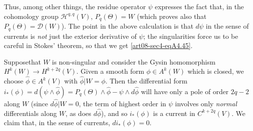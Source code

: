 Thus, among other things, the residue operator $\psi$ expresses the fact that, in the cohomology group $\mathscr{H}^{q,q}(V)$, $P_{q}(\Theta)=W$ (which proves also that $P_{q}(\Theta)=\mathscr{D}(W)$). The point in the above calculation is that $d\psi$ in the sense of currents is {\em not} just the exterior derivative of $\psi$; the singularities force us to be careful in Stokes' theorem, so that we get \eqref{art08-sec4-eqA4.45}.

Suppose\pageoriginale that $W$ is non-singular and consider the Gysin homomorphism $H^{k}(W)\to H^{k+2q}(V)$. Given a smooth form $\phi\in A^{k}(W)$ which is closed, we choose $\widehat{\phi}\in A^{k}(V)$ with $\widehat{\phi}|W=\phi$. Then the differential form $i_{*}(\phi)=d(\psi\wedge \widehat{\phi})=P_{q}(\Theta)\wedge \widehat{\phi}-\psi\wedge d\widehat{\phi}$ will have only a pole of order $2q-2$ along $W$ (since $d\widehat{\phi}|W=0$, the term of highest order in $\psi$ involves only {\em normal} differentials along $W$, as does $d\widehat{\phi}$), and so $i_{*}(\phi)$ is a current in $C^{k+2q}(V)$. We claim that, in the sense of currents, $di_{*}(\phi)=0$.

